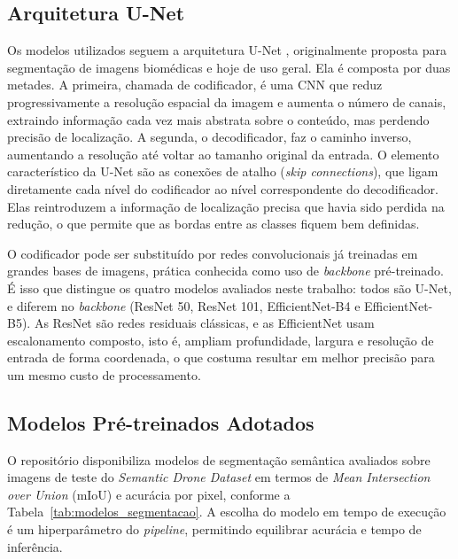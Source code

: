 \documentclass[
    12pt,
    openright,
    oneside,
    a4paper,
    english,
    brazil
]{abntex2}
\begin{document}
\subsection{Arquitetura U-Net}

Os modelos utilizados seguem a arquitetura U-Net \cite{ronneberger2015}, originalmente proposta para segmentação de imagens biomédicas e hoje de uso geral. Ela é composta por duas metades. A primeira, chamada de codificador, é uma CNN que reduz progressivamente a resolução espacial da imagem e aumenta o número de canais, extraindo informação cada vez mais abstrata sobre o conteúdo, mas perdendo precisão de localização. A segunda, o decodificador, faz o caminho inverso, aumentando a resolução até voltar ao tamanho original da entrada. O elemento característico da U-Net são as conexões de atalho (\textit{skip connections}), que ligam diretamente cada nível do codificador ao nível correspondente do decodificador. Elas reintroduzem a informação de localização precisa que havia sido perdida na redução, o que permite que as bordas entre as classes fiquem bem definidas.

O codificador pode ser substituído por redes convolucionais já treinadas em grandes bases de imagens, prática conhecida como uso de \textit{backbone} pré-treinado. É isso que distingue os quatro modelos avaliados neste trabalho: todos são U-Net, e diferem no \textit{backbone} (ResNet 50, ResNet 101, EfficientNet-B4 e EfficientNet-B5). As ResNet são redes residuais clássicas, e as EfficientNet usam escalonamento composto, isto é, ampliam profundidade, largura e resolução de entrada de forma coordenada, o que costuma resultar em melhor precisão para um mesmo custo de processamento.

\subsection{Modelos Pré-treinados Adotados}

O repositório \cite{junior2024_models} disponibiliza modelos de segmentação semântica avaliados sobre imagens de teste do \emph{Semantic Drone Dataset} em termos de \emph{Mean Intersection over Union} (mIoU) e acurácia por pixel, conforme a Tabela~\ref{tab:modelos_segmentacao}. A escolha do modelo em tempo de execução é um hiperparâmetro do \textit{pipeline}, permitindo equilibrar acurácia e tempo de inferência.
\end{document}
